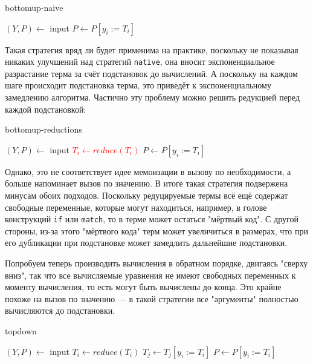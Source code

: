 \documentclass[../diploma.tex]{subfiles}
\begin{document}
\begin{megaalgorithm}
    \caption{bottomup-naive}
  \begin{algorithmic}
    \State $(Y, P)\gets$ input
        \State $P \gets P [y_i := T_i]$
    \EndFor
    \State {}
  \end{algorithmic}
\end{megaalgorithm}

Такая стратегия вряд ли будет применима на практике, поскольку не показывая никаких улучшений над стратегий \texttt{native}, она вносит экспоненциальное разрастание терма за счёт подстановок до вычислений. А поскольку на каждом шаге происходит подстановка терма, это приведёт к экспоненциальному замедлению алгоритма. Частично эту проблему можно решить редукцией перед каждой подстановкой:

\begin{megaalgorithm}
    \caption{bottomup-reductions}
  \begin{algorithmic}
    \State $(Y, P)\gets$ input
        \State \textcolor{red}{$T_i \gets reduce(T_i)$}
        \State $P \gets P [y_i := T_i]$
    \EndFor
    \State {}
  \end{algorithmic}
\end{megaalgorithm}

Однако, это не соответствует идее мемоизации в вызову по необходимости, а больше напоминает вызов по значению. В итоге такая стратегия подвержена минусам обоих подходов. Поскольку редуцируемые термы всё ещё содержат свободные переменные, которые могут находиться, например, в голове конструкций \texttt{if} или \texttt{match}, то в терме может остаться "мёртвый код". С другой стороны, из-за этого "мёртвого кода" терм может увеличиться в размерах, что при его дубликации при подстановке может замедлить дальнейшие подстановки.

Попробуем теперь производить вычисления в обратном порядке, двигаясь "сверху вниз", так что все вычисляемые уравнения не имеют свободных переменных к моменту вычисления, то есть могут быть вычислены до конца. Это крайне похоже на вызов по значению --- в такой стратегии все "аргументы" полностью вычисляются до подстановки.

\begin{megaalgorithm}
    \caption{topdown}
  \begin{algorithmic}
    \State $(Y, P)\gets$ input
        \State $T_i \gets reduce(T_i)$
            \State $T_j \gets T_j [y_i := T_i]$
        \EndFor
        \State $P \gets P [y_i := T_i]$
    \EndFor
    \State {}
  \end{algorithmic}
\end{megaalgorithm} 
\end{document}
